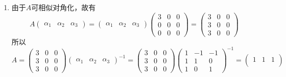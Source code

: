 \begin{solution}
\begin{enumerate}[(1)]
        \item 由于$A$可相似对角化，故有
              \[
                  A
                  \begin{pmatrix}
                      \alpha_1 & \alpha_2 & \alpha_3
                  \end{pmatrix}
                  =
                  \begin{pmatrix}
                      \alpha_1 & \alpha_2 & \alpha_3
                  \end{pmatrix}
                  \begin{pmatrix}
                      3 & 0 & 0 \\
                      0 & 0 & 0 \\
                      0 & 0 & 0
                  \end{pmatrix}
                  =
                  \begin{pmatrix}
                      3 & 0 & 0 \\
                      3 & 0 & 0 \\
                      3 & 0 & 0
                  \end{pmatrix}
              \]
              所以
              \[
                  A =
                  \begin{pmatrix}
                      3 & 0 & 0 \\
                      3 & 0 & 0 \\
                      3 & 0 & 0
                  \end{pmatrix}
                  \begin{pmatrix}
                      \alpha_1 & \alpha_2 & \alpha_3
                  \end{pmatrix}^{-1}
                  =
                  \begin{pmatrix}
                      3 & 0 & 0 \\
                      3 & 0 & 0 \\
                      3 & 0 & 0
                  \end{pmatrix}
                  \begin{pmatrix}
                      1 & -1 & -1 \\
                      1 & 1  & 0  \\
                      1 & 0  & 1
                  \end{pmatrix}^{-1}
                  =
                  \begin{pmatrix}
                      1 & 1 & 1 \\

\end{pmatrix}\]
\end{enumerate}
\end{solution}
